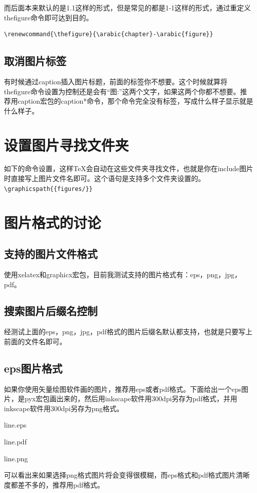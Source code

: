 \documentclass[11pt,oneside]{book}
\begin{document}
而后面本来默认的是1.1这样的形式，但是常见的都是1-1这样的形式，通过重定义thefigure命令即可达到目的。
\begin{Verbatim}
\renewcommand{\thefigure}{\arabic{chapter}-\arabic{figure}}
\end{Verbatim}

\subsection{取消图片标签}
有时候通过caption插入图片标题，前面的标签你不想要。这个时候就算将thefigure命令设置为控制还是会有“图:”这两个文字，如果这两个你都不想要。推荐用caption宏包的caption*命令，那个命令完全没有标签，写成什么样子显示就是什么样子。


\section{设置图片寻找文件夹}
如下的命令设置，这样\TeX 会自动在这些文件夹寻找文件，也就是你在include图片时直接写上图片文件名即可。这个语句是支持多个文件夹设置的。
\verb+\graphicspath{{figures/}}+



\section{图片格式的讨论}
\subsection{支持的图片文件格式}
使用xelatex和graphicx宏包，目前我测试支持的图片格式有：eps，png，jpg，pdf。

\subsection{搜索图片后缀名控制}
经测试上面的eps，png，jpg，pdf格式的图片后缀名默认都支持，也就是只要写上前面的文件名即可。


\subsection{eps图片格式}
如果你使用矢量绘图软件画的图片，推荐用eps或者pdf格式。下面给出一个eps图片，是pyx宏包画出来的，然后用inkscape软件用300dpi另存为pdf格式，并用inkscape软件用300dpi另存为png格式。
\begin{linefig}{line.eps}
\label{fig:line.eps}
\caption{line.eps}
\end{linefig}
\begin{linefig}{line.pdf}
\label{fig:line.pdf}
\caption{line.pdf}
\end{linefig}
\begin{linefig}{line.png}
\label{fig:line.png}
\caption{line.png}
\end{linefig}
可以看出来如果选择png格式图片将会变得很模糊，而eps格式和pdf格式图片清晰度都差不多的，推荐用pdf格式。
\end{document}

